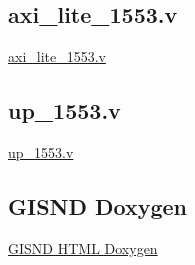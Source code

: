 \documentclass{article}
\begin{document}
  


  \subsection{axi\_lite\_1553.v}
  \href{docs/manual/axi_lite_1553.v}{axi\_lite\_1553.v}

  \subsection{up\_1553.v}
  \href{docs/manual/up_1553-v.html}{up\_1553.v}

  \subsection{GISND Doxygen}
  \href{https://sparkletron.github.io/RODAC/manual/dox/gisnd/html/index.html}{GISND HTML Doxygen}
\end{document}
